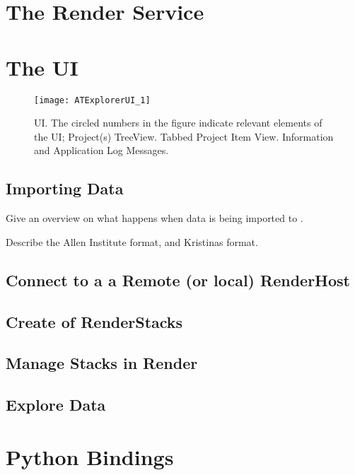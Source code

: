 \section{The Render Service}

\clearpage

\section{The \ate UI}

\begin{figure}[h]
\centering\texttt{[image: ATExplorerUI\_1]}

\caption{\ate{} UI. The circled numbers in the figure indicate relevant elements of the UI; \protect{} Project(s) TreeView. \protect{} Tabbed Project Item View. \protect{} Information and Application Log Messages.}
\end{figure}

\subsection{Importing Data}

\begin{description}[font=$\bullet$~\normalfont\scshape\color{red!50!black}]
\item [Importing process] Give an overview on what happens when data is being imported to \ate.
\item [Data Formats] Describe the Allen Institute format, and Kristinas format.
\end{description}

\subsection{Connect to a a Remote (or local) RenderHost}

\subsection{Create of RenderStacks}

\subsection{Manage Stacks in Render}

\subsection{Explore Data}

\section{Python Bindings}